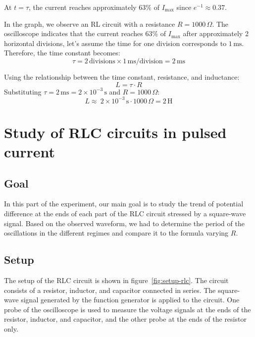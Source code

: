 \documentclass[notitlepage]{report}
\numberwithin{equation}{section}
\theoremstyle{plain}
\theoremstyle{definition}
\theoremstyle{remark}
\begin{document}
At \( t = \tau \), the current reaches approximately \( 63\% \) of \( I_{\text{max}} \) since \( e^{-1} \approx 0.37 \).

In the graph, we observe an RL circuit with a resistance \( R = 1000 \, \Omega \). The oscilloscope indicates that the current reaches \( 63\% \) of \( I_{\text{max}} \) after approximately 2 horizontal divisions, let's assume the time for one division corresponds to \( 1 \, \text{ms} \). Therefore, the time constant becomes:
\[
\tau = 2 \, \text{divisions} \times 1 \, \text{ms/division} = 2 \, \text{ms}
\]

Using the relationship between the time constant, resistance, and inductance:
\[
L = \tau \cdot R
\]
Substituting \( \tau = 2 \, \text{ms} = 2 \times 10^{-3} \, \text{s} \) and \( R = 1000 \, \Omega \):
\[
L  \approx  \ 2 \times 10^{-3} \, \text{s} \cdot 1000 \, \Omega = 2 \, \text{H}
\]


\chapter{Study of RLC circuits in pulsed current}


\section{Goal}
In this part of the experiment, our main goal is to study the trend of potential difference at the ends of each part of the RLC circuit stressed by a square-wave signal. Based on the observed waveform, we had to determine the period of the oscillations in the different regimes and compare it to the formula varying $R$.

\section{Setup}
The setup of the RLC circuit is shown in figure~\ref{fig:setup-rlc}. The circuit
consists of a resistor, inductor, and capacitor connected in series. The
square-wave signal generated by the function generator is applied to the
circuit. One probe of the oscilloscope is used to measure the voltage signals at
the ends of the resistor, inductor, and capacitor, and the other probe at the
ends of the resistor only.
\end{document}
